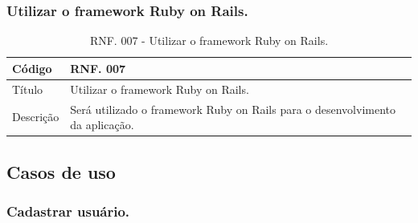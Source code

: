 \documentclass[11pt]{article}
\begin{document}
      \subsubsection{Utilizar o framework Ruby on Rails.}

        \begin{table}[h]
          \begin{center}
            \begin{tabular}{ | p{5cm} | p{10cm} | }
              \hline
              Código\cellcolor{gray} & RNF. 007\cellcolor{gray} \\
              \hline
              Título & Utilizar o framework Ruby on Rails. \\
              \hline
              Descrição & Será utilizado o framework Ruby on Rails para o desenvolvimento da aplicação. \\
              \hline
            \end{tabular}
            \caption{RNF. 007 - Utilizar o framework Ruby on Rails.}
          \end{center}
        \end{table}

    \clearpage

    \subsection{Casos de uso}

      \subsubsection{Cadastrar usuário.}
\end{document}
